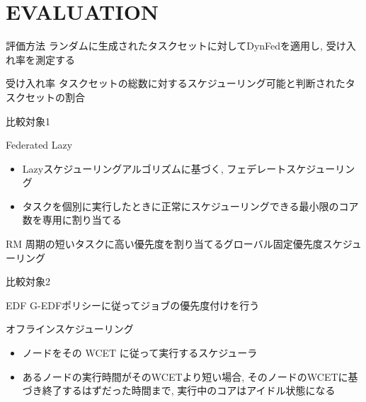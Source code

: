 
\section{EVALUATION}
\label{sec: eva}

\begin{frame}{評価方法}
    ランダムに生成されたタスクセットに対してDynFedを適用し, 受け入れ率を測定する
    \begin{block}{受け入れ率}
        タスクセットの総数に対するスケジューリング可能と判断されたタスクセットの割合
    \end{block}
\end{frame}

\begin{frame}{比較対象1}
    \begin{block}{Federated Lazy}
        \setlength{\linewidth}{0.98\columnwidth}
        \begin{itemize}
            \item Lazyスケジューリングアルゴリズムに基づく, フェデレートスケジューリング
            \item タスクを個別に実行したときに正常にスケジューリングできる最小限のコア数を専用に割り当てる
        \end{itemize}
    \end{block}
    \begin{block}{RM}
        周期の短いタスクに高い優先度を割り当てるグローバル固定優先度スケジューリング
    \end{block}
\end{frame}

\begin{frame}{比較対象2}
    \begin{block}{EDF}
        G-EDFポリシーに従ってジョブの優先度付けを行う
    \end{block}
    \begin{block}{オフラインスケジューリング}
        \begin{itemize}
            \setlength{\linewidth}{0.98\columnwidth}
            \item ノードをその WCET に従って実行するスケジューラ
            \item あるノードの実行時間がそのWCETより短い場合, そのノードのWCETに基づき終了するはずだった時間まで, 実行中のコアはアイドル状態になる
        \end{itemize}
    \end{block}
\end{frame}


